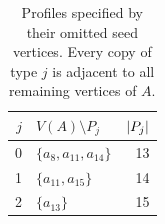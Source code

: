 \begin{table}[H]
\centering
\caption{Profiles specified by their omitted seed vertices. Every copy
of type \(j\) is adjacent to all remaining vertices of \(A\).}
\label{4k4:tab:profiles}
\begin{tabular}{r l r}\toprule
\(j\)&\(V(A)\setminus P_j\)&\(\lvert P_j\rvert\)\\\midrule
0 & \(\{a_8,a_{11},a_{14}\}\)&13\\
1 & \(\{a_{11},a_{15}\}\)&14\\
2 & \(\{a_{13}\}\)&15\\
\bottomrule\end{tabular}
\end{table}
